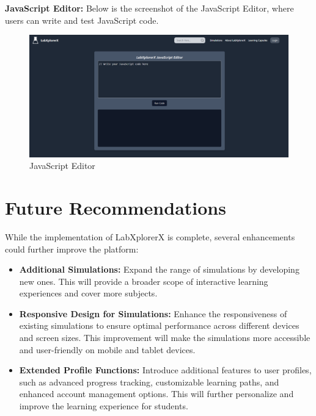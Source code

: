 \textbf{JavaScript Editor:} Below is the screenshot of the JavaScript Editor, where users can write and test JavaScript code.
\begin{figure}[H]
    \centering
    \includegraphics[width = 16cm]{Diagrams/output/js.png}
    \caption{JavaScript Editor}
\end{figure}


\section{Future Recommendations}

While the implementation of LabXplorerX is complete, several enhancements could further improve the platform:

\begin{itemize}[leftmargin=1cm]
    \item \textbf{Additional Simulations:} Expand the range of simulations by developing new ones. This will provide a broader scope of interactive learning experiences and cover more subjects.
    
    \item \textbf{Responsive Design for Simulations:} Enhance the responsiveness of existing simulations to ensure optimal performance across different devices and screen sizes. This improvement will make the simulations more accessible and user-friendly on mobile and tablet devices.
    
    \item \textbf{Extended Profile Functions:} Introduce additional features to user profiles, such as advanced progress tracking, customizable learning paths, and enhanced account management options. This will further personalize and improve the learning experience for students.
\end{itemize}
